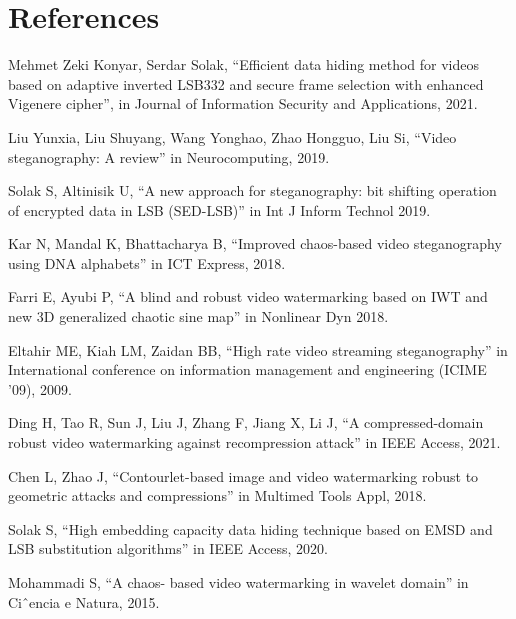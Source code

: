 \chapter{
    \textbf{References}
}
\begin{enumerate}[{[1].}]
    \item Mehmet Zeki Konyar, Serdar Solak, “Efficient data hiding method for videos based on adaptive inverted LSB332 and secure frame selection with enhanced Vigenere cipher”, in Journal of Information Security and Applications, 2021.
    \item Liu Yunxia, Liu Shuyang, Wang Yonghao, Zhao Hongguo, Liu Si, “Video steganography: A review” in Neurocomputing, 2019.
    \item Solak S, Altinisik U, “A new approach for steganography: bit shifting operation of encrypted data in LSB (SED-LSB)” in Int J Inform Technol 2019.
    \item Kar N, Mandal K, Bhattacharya B, “Improved chaos-based video steganography using DNA alphabets” in ICT Express, 2018.
    \item Farri E, Ayubi P, “A blind and robust video watermarking based on IWT and new 3D generalized chaotic sine map” in Nonlinear Dyn 2018.
    \item Eltahir ME, Kiah LM, Zaidan BB, “High rate video streaming steganography” in International conference on information management and engineering (ICIME ’09), 2009.
    \item Ding H, Tao R, Sun J, Liu J, Zhang F, Jiang X, Li J, “A compressed-domain robust video watermarking against recompression attack” in IEEE Access, 2021.
    \item Chen L, Zhao J, “Contourlet-based image and video watermarking robust to geometric attacks and compressions” in Multimed Tools Appl, 2018.
    \item Solak S, “High embedding capacity data hiding technique based on EMSD and LSB substitution algorithms” in IEEE Access, 2020.
    \item Mohammadi S, “A chaos- based video watermarking in wavelet domain” in Ciˆencia e Natura, 2015.
\end{enumerate}